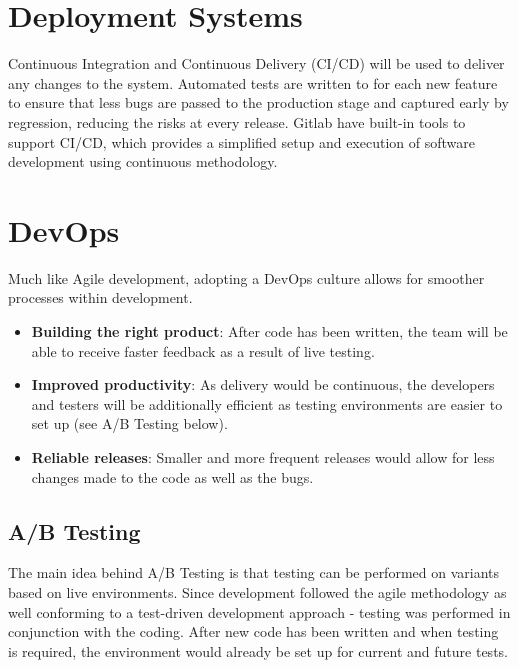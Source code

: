\section{Deployment Systems}
Continuous Integration and Continuous Delivery (CI/CD) will be used to deliver any changes to the system. Automated tests are written to for each new feature to ensure that less bugs are passed to the production stage and captured early by regression, reducing the risks at every release. Gitlab have built-in tools to support CI/CD, which provides a simplified setup and execution of software development using continuous methodology.

\section{DevOps}
Much like Agile development, adopting a DevOps culture allows for smoother processes within development.
\begin{itemize}
    \item \textbf{Building the right product}: After code has been written, the team will be able to receive faster feedback as a result of live testing.
    \item \textbf{Improved productivity}: As delivery would be continuous, the developers and testers will be additionally efficient as testing environments are easier to set up (see A/B Testing below).
    \item \textbf{Reliable releases}: Smaller and more frequent releases would allow for less changes made to the code as well as the bugs.
\end{itemize}

\subsection{A/B Testing}
The main idea behind A/B Testing is that testing can be performed on variants based on live environments. Since development followed the agile methodology as well conforming to a test-driven development approach - testing was performed in conjunction with the coding. After new code has been written and when testing is required, the environment would already be set up for current and future tests.
